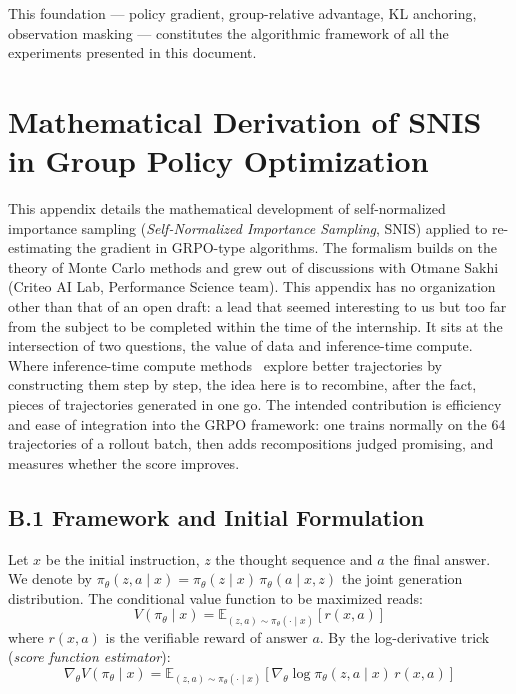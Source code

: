 \documentclass[11pt,a4paper]{article}
\begin{document}
This foundation — policy gradient, group-relative advantage, KL anchoring, observation masking — constitutes the algorithmic framework of all the experiments presented in this document.










\newpage


\section{Mathematical Derivation of SNIS in Group Policy Optimization}
\label{sec:annexe_snis}

This appendix details the mathematical development of self-normalized importance sampling (\emph{Self-Normalized Importance Sampling}, SNIS) applied to re-estimating the gradient in GRPO-type algorithms. The formalism builds on the theory of Monte Carlo methods \cite[chap.~9]{owen2013montecarlo} and grew out of discussions with Otmane Sakhi (Criteo AI Lab, Performance Science team). This appendix has no organization other than that of an open draft: a lead that seemed interesting to us but too far from the subject to be completed within the time of the internship. It sits at the intersection of two questions, the value of data and inference-time compute. Where inference-time compute methods~\cite{snell2024scaling} explore better trajectories by constructing them step by step, the idea here is to recombine, after the fact, pieces of trajectories generated in one go. The intended contribution is efficiency and ease of integration into the GRPO framework: one trains normally on the 64 trajectories of a rollout batch, then adds recompositions judged promising, and measures whether the score improves.


\subsection*{B.1 Framework and Initial Formulation}
Let $x$ be the initial instruction, $z$ the thought sequence and $a$ the final answer. We denote by $\pi_\theta(z, a \mid x) = \pi_\theta(z \mid x)\, \pi_\theta(a \mid x, z)$ the joint generation distribution. The conditional value function to be maximized reads:
\begin{equation}
V(\pi_\theta \mid x) = \mathbb{E}_{(z,a) \sim \pi_\theta(\cdot \mid x)} \left[ r(x,a) \right]
\end{equation}
where $r(x,a)$ is the verifiable reward of answer $a$. By the log-derivative trick (\emph{score function estimator}):
\begin{equation}
\nabla_\theta V(\pi_\theta \mid x) = \mathbb{E}_{(z,a) \sim \pi_\theta(\cdot \mid x)} \left[ \nabla_\theta \log \pi_\theta(z,a \mid x) \, r(x,a) \right]
\label{eq:snis_gradient_base}
\end{equation}
\end{document}
